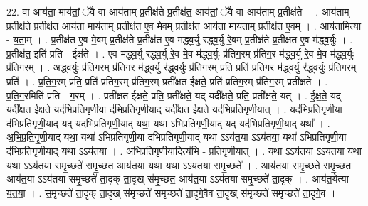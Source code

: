 \documentclass[17pt]{extarticle}
\begin{document}
22. वा आय॑ता॒ माय॑तां॒ ॅवै वा आय॑ताम् प्र॒तीक्ष॑ते प्र॒तीक्ष॑त॒ आय॑तां॒ ॅवै वा आय॑ताम् प्र॒तीक्ष॑ते । . आय॑ताम् प्र॒तीक्ष॑ते प्र॒तीक्ष॑त॒ आय॑ता॒ माय॑ताम् प्र॒तीक्ष॑त ए॒व मे॒वम् प्र॒तीक्ष॑त॒ आय॑ता॒ माय॑ताम् प्र॒तीक्ष॑त ए॒वम् । . आय॑ता॒मित्या - य॒ता॒म् । . प्र॒तीक्ष॑त ए॒व मे॒वम् प्र॒तीक्ष॑ते प्र॒तीक्ष॑त ए॒व म॑द्ध्व॒र्यु र॑द्ध्व॒र्यु रे॒वम् प्र॒तीक्ष॑ते प्र॒तीक्ष॑त ए॒व म॑द्ध्व॒र्युः । . प्र॒तीक्ष॑त॒ इति॑ प्रति - ईक्ष॑ते । . ए॒व म॑द्ध्व॒र्यु र॑द्ध्व॒र्यु रे॒व मे॒व म॑द्ध्व॒र्युः प्र॑तिग॒रम् प्र॑तिग॒र म॑द्ध्व॒र्यु रे॒व मे॒व म॑द्ध्व॒र्युः प्र॑तिग॒रम् । . अ॒द्ध्व॒र्युः प्र॑तिग॒रम् प्र॑तिग॒र म॑द्ध्व॒र्यु र॑द्ध्व॒र्युः प्र॑तिग॒रम् प्रति॒ प्रति॑ प्रतिग॒र म॑द्ध्व॒र्यु र॑द्ध्व॒र्युः प्र॑तिग॒रम् प्रति॑ । . प्र॒ति॒ग॒रम् प्रति॒ प्रति॑ प्रतिग॒रम् प्र॑तिग॒रम् प्रती᳚क्षत ईक्षते॒ प्रति॑ प्रतिग॒रम् प्र॑तिग॒रम् प्रती᳚क्षते । . प्र॒ति॒ग॒रमिति॑ प्रति - ग॒रम् । . प्रती᳚क्षत ईक्षते॒ प्रति॒ प्रती᳚क्षते॒ यद् यदी᳚क्षते॒ प्रति॒ प्रती᳚क्षते॒ यत् । . ई॒क्ष॒ते॒ यद् यदी᳚क्षत ईक्षते॒ यद॑भिप्रतिगृणी॒या द॑भिप्रतिगृणी॒याद् यदी᳚क्षत ईक्षते॒ यद॑भिप्रतिगृणी॒यात् । . यद॑भिप्रतिगृणी॒या द॑भिप्रतिगृणी॒याद् यद् यद॑भिप्रतिगृणी॒याद् यथा॒ यथा॑ ऽभिप्रतिगृणी॒याद् यद् यद॑भिप्रतिगृणी॒याद् यथा᳚ । . अ॒भि॒प्र॒ति॒गृ॒णी॒याद् यथा॒ यथा॑ ऽभिप्रतिगृणी॒या द॑भिप्रतिगृणी॒याद् यथा ऽऽय॑त॒या ऽऽय॑तया॒ यथा॑ ऽभिप्रतिगृणी॒या द॑भिप्रतिगृणी॒याद् यथा ऽऽय॑तया । . अ॒भि॒प्र॒ति॒गृ॒णी॒यादित्य॑भि - प्र॒ति॒गृ॒णी॒यात् । . यथा ऽऽय॑त॒या ऽऽय॑तया॒ यथा॒ यथा ऽऽय॑तया समृ॒च्छते॑ समृ॒च्छत॒ आय॑तया॒ यथा॒ यथा ऽऽय॑तया समृ॒च्छते᳚ । . आय॑तया समृ॒च्छते॑ समृ॒च्छत॒ आय॑त॒या ऽऽय॑तया समृ॒च्छते॑ ता॒दृक् ता॒दृख् स॑मृ॒च्छत॒ आय॑त॒या ऽऽय॑तया समृ॒च्छते॑ ता॒दृक् । . आय॑त॒येत्या - य॒त॒या॒ । . स॒मृ॒च्छते॑ ता॒दृक् ता॒दृख् स॑मृ॒च्छते॑ समृ॒च्छते॑ ता॒दृगे॒वैव ता॒दृख् स॑मृ॒च्छते॑ समृ॒च्छते॑ ता॒दृगे॒व । \newline
\end{document}
